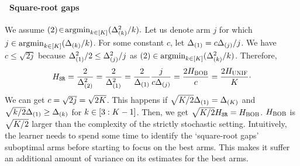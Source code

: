 \paragraph{\raisebox{.04cm}{\textcolor{bull}{$\blacktriangleright$}}~Square-root gaps}   We assume $(2)\!\in\!\mathrm{argmin}_{k\in[K]} (\Delta^2_{(k)}/k).$ 
Let us denote arm $j$ for which  $j\in\mathrm{argmin}_{k\in[K]} (\Delta_{(k)}/k)$. 
For some constant $c$, let $\Delta_{(1)}=c\Delta_{(j)}/j$. We have 
$c\leq \sqrt{2j}$ because  $\Delta^2_{(1)}/2 \leq \Delta^2_{(j)}/j$ 
as  $(2)\in\mathrm{argmin}_{k\in[K]} (\Delta^2_{(k)}/k)$.
Therefore,  \[H_{{\normalfont \texttt{SR}}}=\frac{2}{\Delta^2_{(2)}}=\frac{2}{\Delta^2_{(1)}}= \frac{2}{\Delta_{(1)}} \frac{j}{c\Delta_{(j)}}=\frac{2H_{{\normalfont \textsc{{BOB}}}}}{c}=\frac{2H_{{\normalfont \textsc{UNIF}}}}{K}\cdot\]	
We can get $c=\sqrt{2j}=\sqrt{2K}$.
This happens if 
$\sqrt{K/2}\Delta_{(1)}=\Delta_{(K)}$ and
$\sqrt{k/2}\Delta_{(1)}\geq\Delta_{(k)}$ for $k\in[3:K-1]$. 
Then,  we get  $\sqrt{K/2}H_{{\normalfont \texttt{SR}}}=H_{{\normalfont \textsc{{BOB}}}}$.
$H_{{\normalfont \textsc{{BOB}}}}$ is $\sqrt{K/2}$ larger than the complexity of
the strictly stochastic setting.
Intuitively,  the learner needs to spend some time to 
identify the `square-root gaps' suboptimal arms before starting 
to focus on the best arms. This makes it suffer an additional amount
of variance on its estimates for the best arms.
%
%
%  

